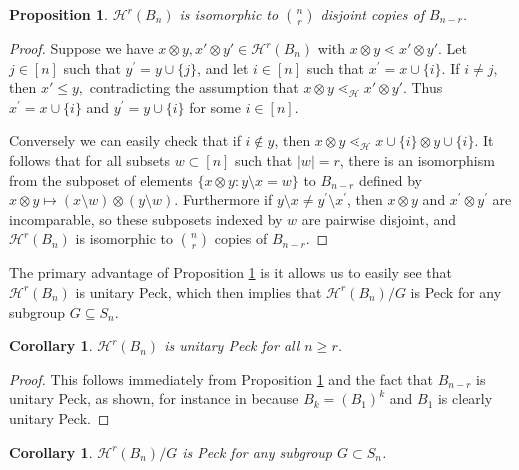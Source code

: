 \documentclass{amsart}
\newtheorem{cor}[thm]{Corollary}
\newtheorem{prop}[thm]{Proposition}
\theoremstyle{remark}
\begin{document}
\begin{prop}\label{prop:computing_HBn}
$\mathcal{H}^r(B_n)$ is isomorphic to $\binom{n}{r}$ disjoint copies of $B_{n-r}$.
\end{prop}

\begin{proof}

Suppose we have $x\otimes y,x'\otimes y' \in \mathcal H^r(B_n)$ with $x\otimes y \lessdot x'\otimes y'.$ Let $j\in [n]$ such that $y^\prime = y\cup\{j\}$, and let $i\in [n]$ such that $x^\prime = x\cup \{i\}$. If $i \ne j,$ then $x' \leq y,$ contradicting the assumption that $x\otimes y \lessdot_{\mathcal H} x'\otimes y'.$ Thus $x^\prime = x\cup\{i\}$ and $y^\prime = y\cup\{i\}$ for some $i\in [n]$.

Conversely we can easily check that if $i\not\in y$, then $x\otimes y\lessdot_{\mathcal{H}} x\cup\{i\}\otimes y\cup\{i\}$.  It follows that for all subsets $w\subset [n]$ such that $|w| = r$, there is an isomorphism from the subposet of elements $\{x\otimes y\colon y\setminus x = w\}$ to $B_{n-r}$ defined by $x\otimes y\mapsto (x\setminus w)\otimes (y\setminus w)$.  Furthermore if $y\setminus x \ne y^\prime \setminus x^\prime$, then $x\otimes y$ and $x^\prime\otimes y^\prime$ are incomparable, so these subposets indexed by $w$ are pairwise disjoint, and $\mathcal{H}^r(B_n)$ is isomorphic to $\binom{n}{r}$ copies of $B_{n-r}$.
\end{proof}



The primary advantage of Proposition \ref{prop:computing_HBn} is it allows us to easily see that $\mathcal{H}^r(B_n)$ is unitary Peck, which then implies that $\mathcal{H}^r(B_n)/G$ is Peck for any subgroup $G\subseteq S_n$.


\begin{cor}\label{cor:HBn_unitary_peck}
$\mathcal{H}^r(B_n)$ is unitary Peck for all $n\ge r$.
\end{cor}

\begin{proof}
This follows immediately from Proposition \ref{prop:computing_HBn} and the fact that $B_{n-r}$ is unitary Peck, as shown, for instance in \cite[Theorem 2a]{quotients_stanley} because $B_k = (B_1)^k$ and $B_1$ is clearly unitary Peck.
\end{proof}

\begin{cor}\label{cor:quotients_of_HBn_peck}
$\mathcal{H}^r(B_n)/G$ is Peck for any subgroup $G\subset S_n$.
\end{cor}
\end{document}
